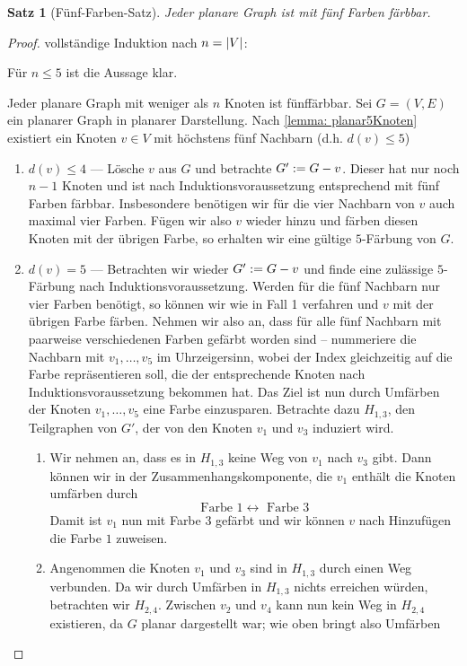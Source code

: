 \documentclass[ngerman, a4paper, 12pt]{article}
\newcounter{themcount}
\theoremstyle{plain}
\newtheorem{satz}[themcount]{Satz}
\theoremstyle{break}
\theoremstyle{proofstyle}
\newtheorem{proof}{Beweis}
\newcommand{\ianfang}[1][]{%
	\ifthenelse{\isempty{#1}}{%
		\item[\textbf{(IA)}]%
	}{%
		\item[\textbf{(IA)}] {#1 :} %
	}%
}
\newcommand{\ivoraussetzung}{\item[\bfseries (IV)]}
\newcommand{\ischritt}[1][]{%
	\ifthenelse{\isempty{#1}}{%
		\item[\textbf{(IS)}]
	}{%
		\item[\textbf{(IS)}] {#1 :} %
	}%
}
\begin{document}
	
	\begin{satz}[Fünf-Farben-Satz]
		Jeder planare Graph ist mit fünf Farben färbbar.
	\end{satz}
	\begin{proof} vollständige Induktion nach $n = \left| V \right|$:
		\begin{description}
		\ianfang Für $n \le 5$ ist die Aussage klar.
		\ivoraussetzung Jeder planare Graph mit weniger als $n$ Knoten ist fünffärbbar.
		\ischritt Sei $G = (V,E)$ ein planarer Graph in planarer Darstellung. Nach \cref{lemma: planar5Knoten} existiert ein Knoten $v \in V$ mit höchstens fünf Nachbarn (d.h. $d(v) \le 5$)
		\begin{enumerate}[label=Fall \arabic*:]
			\item $d(v) \le 4$ --- Lösche $v$ aus $G$ und betrachte $G' \mathrel{:=} G - v$. Dieser hat nur noch $n-1$ Knoten und ist nach Induktionsvoraussetzung entsprechend mit fünf Farben färbbar. Insbesondere benötigen wir für die vier Nachbarn von $v$ auch maximal vier Farben. Fügen wir also $v$ wieder hinzu  und färben diesen Knoten mit der übrigen Farbe, so erhalten wir eine gültige $5$-Färbung von $G$. 
			\item $d(v) = 5$ --- Betrachten wir wieder $G' \mathrel{:=} G - v$ und finde eine zulässige $5$-Färbung nach Induktionsvoraussetzung. Werden für die fünf Nachbarn nur vier Farben benötigt, so können wir wie in Fall 1 verfahren und $v$ mit der übrigen Farbe färben. Nehmen wir also an, dass für alle fünf Nachbarn mit paarweise verschiedenen Farben gefärbt worden sind -- nummeriere die Nachbarn mit $v_1, \dots, v_5$ im Uhrzeigersinn, wobei der Index gleichzeitig auf die Farbe repräsentieren soll, die der entsprechende Knoten nach Induktionsvoraussetzung bekommen hat. Das Ziel ist nun durch Umfärben der Knoten $v_1, \dots, v_5$ eine Farbe einzusparen. Betrachte dazu $H_{1,3}$, den Teilgraphen von $G'$, der von den Knoten $v_1$ und $v_3$ induziert wird.
			\begin{enumerate}[label=\alph*),topsep=-\parskip]
				\item Wir nehmen an, dass es in $H_{1,3}$ keine Weg von $v_1$ nach $v_3$ gibt. Dann können wir in der Zusammenhangskomponente, die $v_1$ enthält die Knoten umfärben durch
				\begin{equation*}
					\text{Farbe } 1 \leftrightarrow \text{ Farbe } 3
				\end{equation*}
				Damit ist $v_1$ nun mit Farbe $3$ gefärbt und wir können $v$ nach Hinzufügen die Farbe $1$ zuweisen.
				\item Angenommen die Knoten $v_1$ und $v_3$ sind in $H_{1,3}$ durch einen Weg verbunden. Da wir durch Umfärben in $H_{1,3}$ nichts erreichen würden, betrachten wir $H_{2,4}$. Zwischen $v_2$ und $v_4$ kann nun kein Weg in $H_{2,4}$ existieren, da $G$ planar dargestellt war; wie oben bringt also Umfärben

\end{enumerate}
\end{enumerate}
\end{description}
\end{proof}
\end{document}
